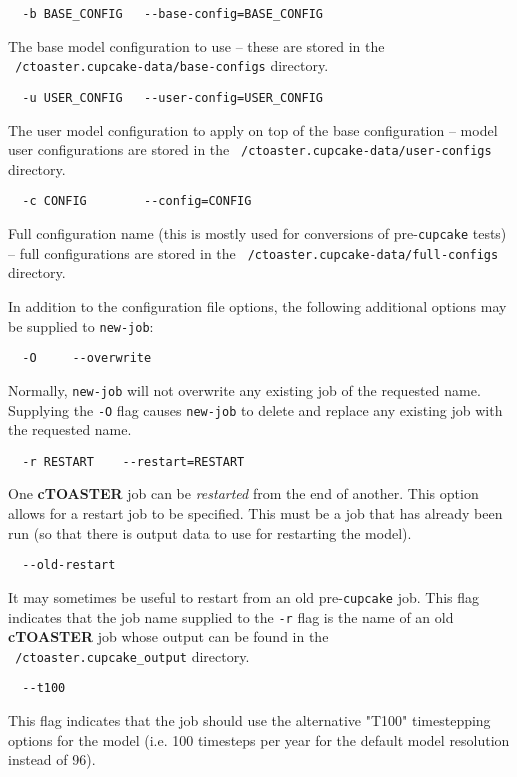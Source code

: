 \documentclass[a4paper,10pt,article]{memoir}
\begin{document}
\begin{verbatim}
  -b BASE_CONFIG   --base-config=BASE_CONFIG
\end{verbatim}
The base model configuration to use -- these are stored in the
\texttt{~/ctoaster.cupcake-data/base-configs} directory.

\begin{verbatim}
  -u USER_CONFIG   --user-config=USER_CONFIG
\end{verbatim}
The user model configuration to apply on top of the base configuration
-- model user configurations are stored in the
\texttt{~/ctoaster.cupcake-data/user-configs} directory.

\begin{verbatim}
  -c CONFIG        --config=CONFIG
\end{verbatim}
Full configuration name (this is mostly used for conversions of
pre-\texttt{cupcake} tests) -- full configurations are stored in the
\texttt{~/ctoaster.cupcake-data/full-configs} directory.

In addition to the configuration file options, the following
additional options may be supplied to \texttt{new-job}:

\begin{verbatim}
  -O     --overwrite
\end{verbatim}
Normally, \texttt{new-job} will not overwrite any existing job of the
requested name.  Supplying the \texttt{-O} flag causes
\texttt{new-job} to delete and replace any existing job with the
requested name.

\begin{verbatim}
  -r RESTART    --restart=RESTART
\end{verbatim}
One \textbf{cTOASTER} job can be \emph{restarted} from the end of another.  This
option allows for a restart job to be specified.  This must be a job
that has already been run (so that there is output data to use for
restarting the model).

\begin{verbatim}
  --old-restart
\end{verbatim}
It may sometimes be useful to restart from an old pre-\texttt{cupcake}
job.  This flag indicates that the job name supplied to the
\texttt{-r} flag is the name of an old \textbf{cTOASTER} job whose output can be
found in the 
\\\texttt{~/ctoaster.cupcake\_output} directory.

\begin{verbatim}
  --t100
\end{verbatim}
This flag indicates that the job should use the alternative "T100"
timestepping options for the model (i.e. 100 timesteps per year for
the default model resolution instead of 96).
\end{document}
